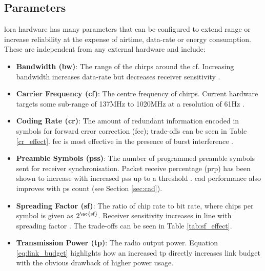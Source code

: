 \subsection{Parameters}
\ac{lora} hardware has many parameters that can be configured to extend range or increase reliability at the expense of airtime, data-rate or energy consumption. These are independent from any external hardware and include:
\begin{itemize}
    \item \textbf{Bandwidth (\ac{bw})}: The range of the chirps around the \ac{cf}. Increasing bandwidth increases data-rate but decreases receiver sensitivity \cite{3YP:STUDY_OF_LORA}.
    \item \textbf{Carrier Frequency (\ac{cf})}: The centre frequency of chirps. Current hardware targets some sub-range of 137MHz to 1020MHz at a resolution of 61Hz \cite{3YP:LORA_SX12}. 
    \item \textbf{Coding Rate (\ac{cr})}: The amount of redundant information encoded in symbols for forward error correction (\ac{fec}); trade-offs can be seen in Table \ref{cr_effect}. \ac{fec} is most effective in the presence of burst interference \cite{3YP:LORA_MOD_BASICS}.
    \item \textbf{Preamble Symbols (\ac{ps}s)}: The number of programmed preamble symbols sent for receiver synchronisation. Packet receive percentage (\ac{prp}) has been shown to increase with increased \ac{ps}s up to a threshold \cite{3YP:LORA_PERFORMANCE}. \ac{cad} performance also improves with \ac{ps} count (see Section \ref{sec:cad}).
    \item \textbf{Spreading Factor (\ac{sf})}: The ratio of chip rate to bit rate, where chips per symbol is given as $2^{\text{\ac{sf}}}$. Receiver sensitivity increases in line with spreading factor \cite{3YP:LORA_SX12}. The trade-offs can be seen in Table \ref{tab:sf_effect}.
    \item \textbf{Transmission Power (\ac{tp})}: The radio output power. Equation \ref{eq:link_budget} highlights how an increased \ac{tp} directly increases link budget with the obvious drawback of higher power usage. 
\end{itemize}


